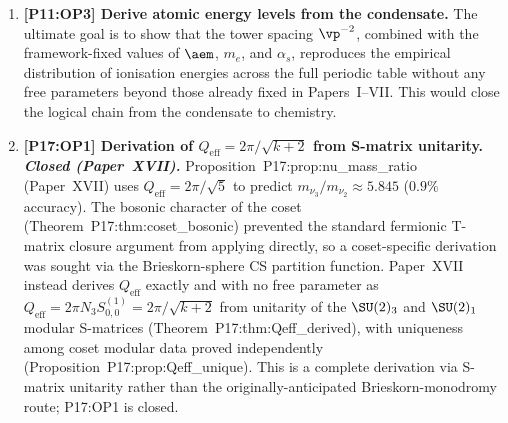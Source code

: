 \begin{enumerate}[label=,leftmargin=*]
\item \textbf{[P11:OP3] Derive atomic energy levels from the condensate.}
The ultimate goal is to show that the tower spacing $\vp^{-2}$,
combined with the framework-fixed values of $\aem$, $m_e$,
and $\alpha_s$, reproduces the empirical distribution of
ionisation energies across the full periodic table without
any free parameters beyond those already fixed in Papers~I--VII.
This would close the logical chain from the condensate to chemistry.

\item \textbf{[P17:OP1] Derivation of $Q_{\mathrm{eff}}=2\pi/\sqrt{k+2}$ from S-matrix unitarity. \emph{Closed (Paper~XVII).}}
Proposition~P17:prop:nu\_mass\_ratio (Paper~XVII) uses $Q_{\mathrm{eff}}=2\pi/\sqrt{5}$
to predict $m_{\nu_3}/m_{\nu_2}\approx5.845$ ($0.9\%$ accuracy). The
bosonic character of the coset (Theorem~P17:thm:coset\_bosonic) prevented the
standard fermionic T-matrix closure argument from applying directly, so a
coset-specific derivation was sought via the Brieskorn-sphere CS partition
function. Paper~XVII instead derives $Q_{\mathrm{eff}}$ exactly and with no
free parameter as $Q_{\mathrm{eff}}=2\pi N_3 S^{(1)}_{0,0}=2\pi/\sqrt{k+2}$
from unitarity of the $\SU(2)_3$ and $\SU(2)_1$ modular S-matrices
(Theorem~P17:thm:Qeff\_derived), with uniqueness among coset modular data
proved independently (Proposition~P17:prop:Qeff\_unique). This is a complete
derivation via S-matrix unitarity rather than the originally-anticipated
Brieskorn-monodromy route; P17:OP1 is closed.


\end{enumerate}
